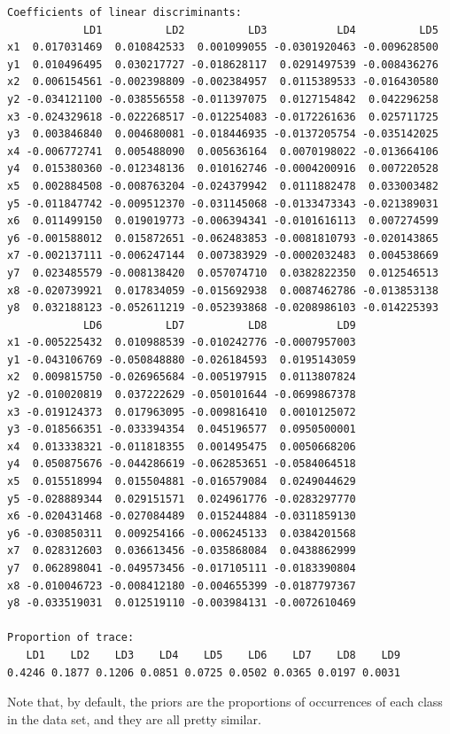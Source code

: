 \documentclass[
  letterpaper,
  DIV=11,
  numbers=noendperiod]{scrartcl}
\begin{document}
\begin{verbatim}
Coefficients of linear discriminants:
            LD1          LD2          LD3           LD4          LD5
x1  0.017031469  0.010842533  0.001099055 -0.0301920463 -0.009628500
y1  0.010496495  0.030217727 -0.018628117  0.0291497539 -0.008436276
x2  0.006154561 -0.002398809 -0.002384957  0.0115389533 -0.016430580
y2 -0.034121100 -0.038556558 -0.011397075  0.0127154842  0.042296258
x3 -0.024329618 -0.022268517 -0.012254083 -0.0172261636  0.025711725
y3  0.003846840  0.004680081 -0.018446935 -0.0137205754 -0.035142025
x4 -0.006772741  0.005488090  0.005636164  0.0070198022 -0.013664106
y4  0.015380360 -0.012348136  0.010162746 -0.0004200916  0.007220528
x5  0.002884508 -0.008763204 -0.024379942  0.0111882478  0.033003482
y5 -0.011847742 -0.009512370 -0.031145068 -0.0133473343 -0.021389031
x6  0.011499150  0.019019773 -0.006394341 -0.0101616113  0.007274599
y6 -0.001588012  0.015872651 -0.062483853 -0.0081810793 -0.020143865
x7 -0.002137111 -0.006247144  0.007383929 -0.0002032483  0.004538669
y7  0.023485579 -0.008138420  0.057074710  0.0382822350  0.012546513
x8 -0.020739921  0.017834059 -0.015692938  0.0087462786 -0.013853138
y8  0.032188123 -0.052611219 -0.052393868 -0.0208986103 -0.014225393
            LD6          LD7          LD8           LD9
x1 -0.005225432  0.010988539 -0.010242776 -0.0007957003
y1 -0.043106769 -0.050848880 -0.026184593  0.0195143059
x2  0.009815750 -0.026965684 -0.005197915  0.0113807824
y2 -0.010020819  0.037222629 -0.050101644 -0.0699867378
x3 -0.019124373  0.017963095 -0.009816410  0.0010125072
y3 -0.018566351 -0.033394354  0.045196577  0.0950500001
x4  0.013338321 -0.011818355  0.001495475  0.0050668206
y4  0.050875676 -0.044286619 -0.062853651 -0.0584064518
x5  0.015518994  0.015504881 -0.016579084  0.0249044629
y5 -0.028889344  0.029151571  0.024961776 -0.0283297770
x6 -0.020431468 -0.027084489  0.015244884 -0.0311859130
y6 -0.030850311  0.009254166 -0.006245133  0.0384201568
x7  0.028312603  0.036613456 -0.035868084  0.0438862999
y7  0.062898041 -0.049573456 -0.017105111 -0.0183390804
x8 -0.010046723 -0.008412180 -0.004655399 -0.0187797367
y8 -0.033519031  0.012519110 -0.003984131 -0.0072610469

Proportion of trace:
   LD1    LD2    LD3    LD4    LD5    LD6    LD7    LD8    LD9 
0.4246 0.1877 0.1206 0.0851 0.0725 0.0502 0.0365 0.0197 0.0031 
\end{verbatim}

Note that, by default, the priors are the proportions of occurrences of
each class in the data set, and they are all pretty similar.
\end{document}
